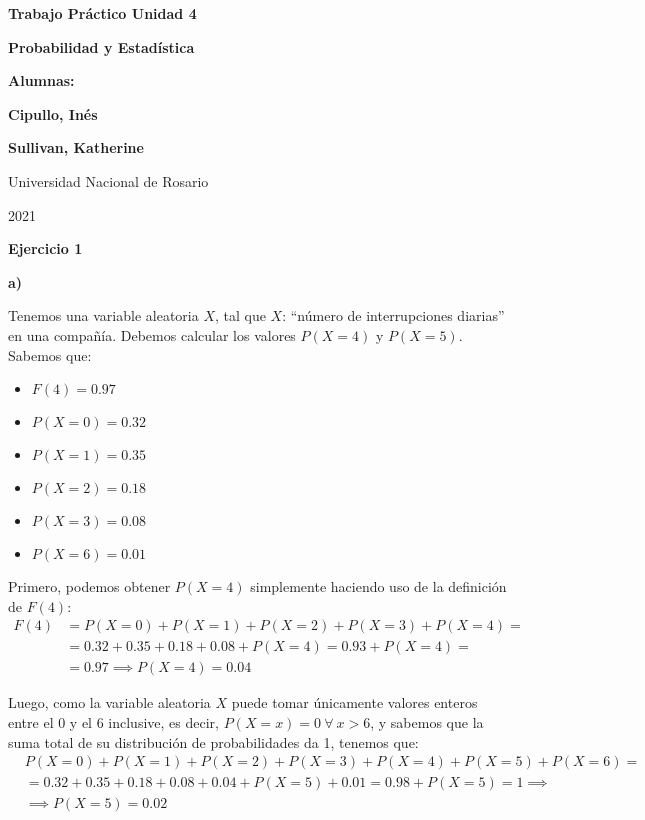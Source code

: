 \documentclass[11pt]{article}
\begin{document}
\begin{titlepage}
    \begin{center}
        \vfill
        \vfill
            \vspace{0.7cm}
            \noindent\textbf{\Huge Trabajo Pr\'actico Unidad 4}\par
            \noindent\textbf{\Huge Probabilidad y Estad\'istica}\par
            \vspace{.5cm}
        \vfill
        \noindent \textbf{\huge Alumnas:}\par
        \vspace{.5cm}
        \noindent \textbf{\Large Cipullo, In\'es}\par
        \noindent \textbf{\Large Sullivan, Katherine}\par
 
        \vfill
        \large Universidad Nacional de Rosario \par
        \noindent\large 2021
    \end{center}
\end{titlepage}
\par


\textbf{Ejercicio 1}

\textbf{a)} \par
Tenemos una variable aleatoria $X$, tal que $X$: ``n\'umero de interrupciones diarias'' en una compa\~{n}\'ia. 
Debemos calcular los valores $P(X=4)$ y $P(X=5)$. Sabemos que:  

\begin{itemize}
    \item $F(4) = 0.97$
    \item $P(X=0) = 0.32$ 
    \item $P(X=1) = 0.35$
    \item $P(X=2) = 0.18$
    \item $P(X=3) = 0.08$
    \item $P(X=6) = 0.01$
\end{itemize}

Primero, podemos obtener $P(X=4)$ simplemente haciendo uso de la definici\'on de $F(4)$: 
\begin{align*}
    F(4)& = P(X=0) + P(X=1) + P(X=2) + P(X=3) + P(X=4) =\\
        & = 0.32 + 0.35 + 0.18 + 0.08 + P(X=4) = 0.93 + P(X=4) =\\
        & = 0.97 \implies P(X=4) = 0.04
\end{align*}

Luego, como la variable aleatoria $X$ puede tomar \'unicamente valores enteros entre el 0 y el 6 inclusive, es decir, $P(X=x) = 0\ \forall\ x > 6$, y sabemos que la suma total de su distribuci\'on de probabilidades da 1, tenemos que:
\begin{align*}
    &P(X=0) + P(X=1) + P(X=2) + P(X=3) + P(X=4) + P(X=5) + P(X=6) = \\
    &= 0.32 + 0.35 + 0.18 + 0.08 + 0.04 + P(X=5) + 0.01 = 0.98 + P(X=5) = 1 \implies \\
    &\implies P(X=5) = 0.02 
\end{align*}
\end{document}
